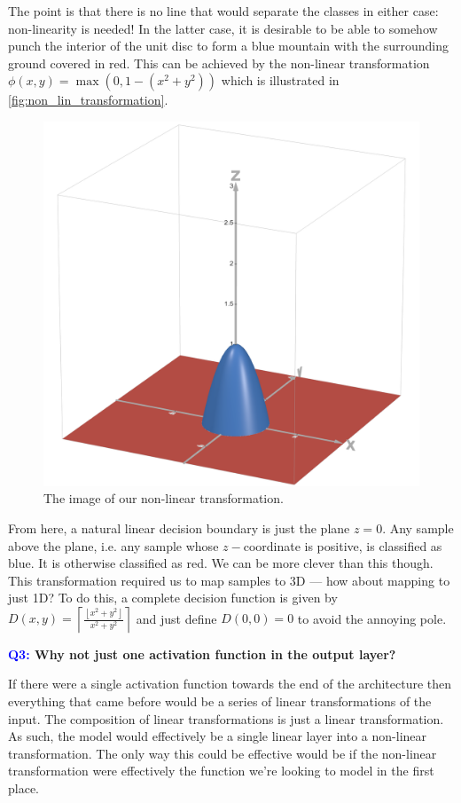 \documentclass[11pt]{article}
\begin{document}
\noindent The point is that there is no line that would separate the classes in either case: non-linearity is needed! In the latter case, it is desirable to be able to somehow punch the interior of the unit disc to form a blue mountain with the surrounding ground covered in red. This can be achieved by the non-linear transformation $\phi(x,y)=\max(0,1-(x^2+y^2))$ which is illustrated in \autoref{fig:non_lin_transformation}.

\begin{figure}[ht]
    \centering
    \includegraphics[width=0.40\columnwidth]{./figures/neural_nets/non_lin_transform.png}
    \caption{\centering The image of our non-linear transformation.}
    \label{fig:non_lin_transformation}
\end{figure}

From here, a natural linear decision boundary is just the plane $z=0$. Any sample above the plane, i.e. any sample whose $z-$coordinate is positive, is classified as blue. It is otherwise classified as red. We can be more clever than this though. This transformation required us to map samples to 3D — how about mapping to just 1D? To do this, a complete decision function is given by $D(x,y)=\left\lceil\frac{\left\lfloor x^2+y^2\right\rfloor}{x^2+y^2}\right\rceil$ and just define $D(0,0)=0$ to avoid the annoying pole.

\begin{center}
    \textbf{\textcolor{blue}{Q3:} Why not just one activation function in the output layer?}
\end{center}
If there were a single activation function towards the end of the architecture then everything that came before would be a series of linear transformations of the input. The composition of linear transformations is just a linear transformation. As such, the model would effectively be a single linear layer into a non-linear transformation. The only way this could be effective would be if the non-linear transformation were effectively the function we're looking to model in the first place.
\end{document}

